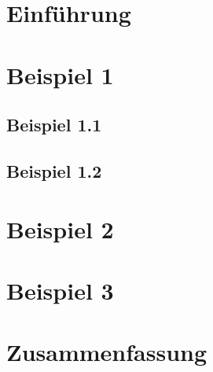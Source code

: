 \chapter{Einführung}

\chapter{Beispiel 1}
\lipsum
\section{Beispiel 1.1}
\lipsum[1]
\section{Beispiel 1.2}
\lipsum
\chapter{Beispiel 2}
\lipsum
\chapter{Beispiel 3}
\lipsum


\chapter{Zusammenfassung}